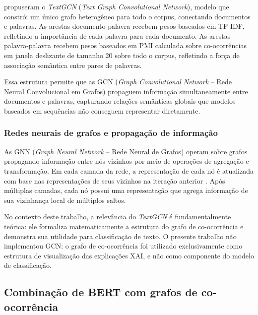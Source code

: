 \documentclass[
    12pt,                %
    openright,           %
    oneside,             %
    a4paper,             %
    english,             %
    brazil               %
]{abntex2}
\begin{document}
 propuseram o \textit{TextGCN} (\textit{Text Graph Convolutional Network}), modelo que constrói um único grafo heterogêneo para todo o corpus, conectando documentos e palavras. As arestas documento-palavra recebem pesos baseados em TF-IDF, refletindo a importância de cada palavra para cada documento. As arestas palavra-palavra recebem pesos baseados em PMI calculada sobre co-ocorrências em janela deslizante de tamanho 20 sobre todo o corpus, refletindo a força de associação semântica entre pares de palavras.

Essa estrutura permite que as GCN (\textit{Graph Convolutional Network} -- Rede Neural Convolucional em Grafos) propaguem informação simultaneamente entre documentos e palavras, capturando relações semânticas globais que modelos baseados em sequências não conseguem representar diretamente.

\subsubsection{Redes neurais de grafos e propagação de informação}
\label{subsubsec:textgcn_gcn}

As GNN (\textit{Graph Neural Network} -- Rede Neural de Grafos) operam sobre grafos propagando informação entre nós vizinhos por meio de operações de agregação e transformação. Em cada camada da rede, a representação de cada nó é atualizada com base nas representações de seus vizinhos na iteração anterior \cite{yao2019}. Após múltiplas camadas, cada nó possui uma representação que agrega informação de sua vizinhança local de múltiplos saltos.

No contexto deste trabalho, a relevância do \textit{TextGCN} é fundamentalmente teórica: ele formaliza matematicamente a estrutura do grafo de co-ocorrência e demonstra sua utilidade para classificação de texto. O presente trabalho não implementou GCN: o grafo de co-ocorrência foi utilizado exclusivamente como estrutura de visualização das explicações XAI, e não como componente do modelo de classificação.

\subsection{Combinação de BERT com grafos de co-ocorrência}
\label{subsec:bert_grafo}

\end{document}

